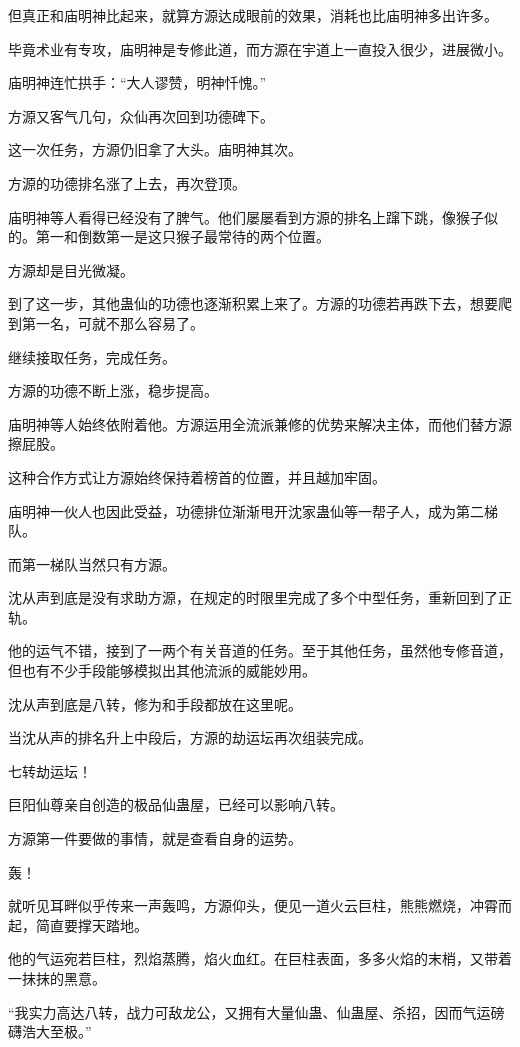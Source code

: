 \begin{this_body}
但真正和庙明神比起来，就算方源达成眼前的效果，消耗也比庙明神多出许多。

毕竟术业有专攻，庙明神是专修此道，而方源在宇道上一直投入很少，进展微小。

庙明神连忙拱手：“大人谬赞，明神忏愧。”

方源又客气几句，众仙再次回到功德碑下。

这一次任务，方源仍旧拿了大头。庙明神其次。

方源的功德排名涨了上去，再次登顶。

庙明神等人看得已经没有了脾气。他们屡屡看到方源的排名上蹿下跳，像猴子似的。第一和倒数第一是这只猴子最常待的两个位置。

方源却是目光微凝。

到了这一步，其他蛊仙的功德也逐渐积累上来了。方源的功德若再跌下去，想要爬到第一名，可就不那么容易了。

继续接取任务，完成任务。

方源的功德不断上涨，稳步提高。

庙明神等人始终依附着他。方源运用全流派兼修的优势来解决主体，而他们替方源擦屁股。

这种合作方式让方源始终保持着榜首的位置，并且越加牢固。

庙明神一伙人也因此受益，功德排位渐渐甩开沈家蛊仙等一帮子人，成为第二梯队。

而第一梯队当然只有方源。

沈从声到底是没有求助方源，在规定的时限里完成了多个中型任务，重新回到了正轨。

他的运气不错，接到了一两个有关音道的任务。至于其他任务，虽然他专修音道，但也有不少手段能够模拟出其他流派的威能妙用。

沈从声到底是八转，修为和手段都放在这里呢。

当沈从声的排名升上中段后，方源的劫运坛再次组装完成。

七转劫运坛！

巨阳仙尊亲自创造的极品仙蛊屋，已经可以影响八转。

方源第一件要做的事情，就是查看自身的运势。

轰！

就听见耳畔似乎传来一声轰鸣，方源仰头，便见一道火云巨柱，熊熊燃烧，冲霄而起，简直要撑天踏地。

他的气运宛若巨柱，烈焰蒸腾，焰火血红。在巨柱表面，多多火焰的末梢，又带着一抹抹的黑意。

“我实力高达八转，战力可敌龙公，又拥有大量仙蛊、仙蛊屋、杀招，因而气运磅礴浩大至极。”


\end{this_body}
